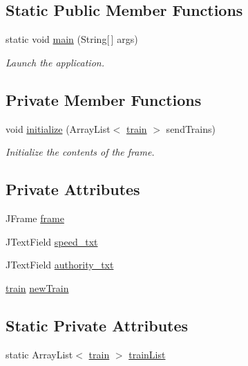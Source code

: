\subsection*{Static Public Member Functions}
\begin{DoxyCompactItemize}
\item 
static void \hyperlink{classdispatchTrainPopup_a339856eed3f163cacde0a351981f1829}{main} (String\mbox{[}$\,$\mbox{]} args)
\begin{DoxyCompactList}\small\item\em Launch the application. \end{DoxyCompactList}\end{DoxyCompactItemize}
\subsection*{Private Member Functions}
\begin{DoxyCompactItemize}
\item 
void \hyperlink{classdispatchTrainPopup_abd0cc81d2cf2f62041d0907ec073f54a}{initialize} (Array\+List$<$ \hyperlink{classtrain}{train} $>$ send\+Trains)
\begin{DoxyCompactList}\small\item\em Initialize the contents of the frame. \end{DoxyCompactList}\end{DoxyCompactItemize}
\subsection*{Private Attributes}
\begin{DoxyCompactItemize}
\item 
J\+Frame \hyperlink{classdispatchTrainPopup_ab5ad8c5fe16cc24bf0777e8c970cedc6}{frame}
\item 
J\+Text\+Field \hyperlink{classdispatchTrainPopup_a16bb03a5f638b24aeed36ef422cfbe7b}{speed\+\_\+txt}
\item 
J\+Text\+Field \hyperlink{classdispatchTrainPopup_af72be221c2943e863a462897b99c3e45}{authority\+\_\+txt}
\item 
\hyperlink{classtrain}{train} \hyperlink{classdispatchTrainPopup_ac2d599056dc80d9fb1f360419db9f13a}{new\+Train}
\end{DoxyCompactItemize}
\subsection*{Static Private Attributes}
\begin{DoxyCompactItemize}
\item 
static Array\+List$<$ \hyperlink{classtrain}{train} $>$ \hyperlink{classdispatchTrainPopup_aeb7e9142a54631b84a4d72dc4b7913dd}{train\+List}
\end{DoxyCompactItemize}


